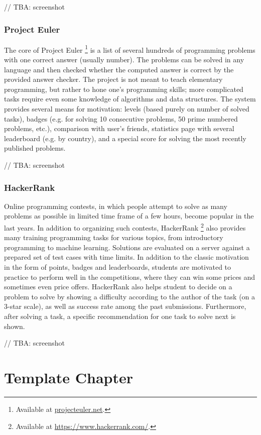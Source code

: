 \documentclass[
    digital,    %
    oneside,    %
    color,
    11pt,
    nocover,
    notable,
    nolof,
    nolot,
    final
]{fithesis3}
\begin{document}
// TBA: screenshot


\subsection{Project Euler}
\label{sec:project-euler}
The core of Project Euler%
\footnote{Available at \url{projecteuler.net}.}
is a list of several hundreds of programming problems with one correct answer (usually number).
The problems can be solved in any language
and then checked whether the computed answer is correct by the provided answer checker.
The project is not meant to teach elementary programming,
but rather to hone one’s programming skills;
more complicated tasks require even some knowledge of algorithms and data structures.
The system provides several means for motivation:
levels (based purely on number of solved tasks), badges
(e.g. for solving 10 consecutive problems, 50 prime numbered problems, etc.),
comparison with user’s friends,
statistics page with several leaderboard (e.g. by country),
and a special score for solving the most recently published problems.

// TBA: screenshot


\subsection{HackerRank}
\label{sec:hacker-rank}

Online programming contests,
in which people attempt to solve as many problems as possible
in limited time frame of a few hours,
become popular in the last years.
In addition to organizing such contests,
HackerRank%
\footnote{Available at \url{https://www.hackerrank.com/}.}
also provides many training programming tasks for various topics,
from introductory programming to machine learning.
Solutions are evaluated on a server against a prepared set of test cases with time limits.
In addition to the classic motivation in the form of points, badges and leaderboards, students are motivated to practice to perform well in the competitions,
where they can win some prices and sometimes even price offers.
HackerRank also helps student to decide on a problem to solve by showing a difficulty according to the author of the task (on a 3-star scale),
as well as success rate among the past submissions.
Furthermore, after solving a task,
a specific recommendation for one task to solve next is shown.

// TBA: screenshot


\chapter{Template Chapter}
\label{chap:template}
\end{document}
